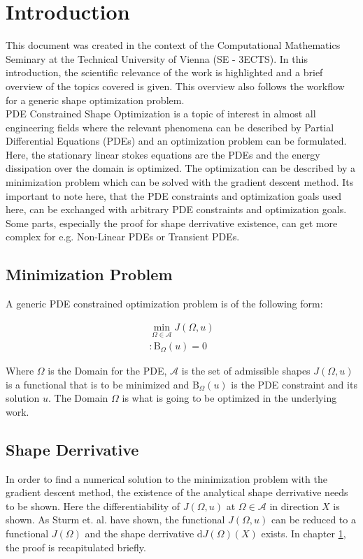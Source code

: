 \section{Introduction}

This document was created in the context of the Computational Mathematics Seminary
at the Technical University of Vienna (SE - 3ECTS). In this introduction, the scientific relevance
of the work is highlighted and a brief overview of the topics covered is given. This overview
also follows the workflow for a generic shape optimization problem.\\

PDE Constrained Shape Optimization is a topic of interest in almost all engineering fields
where the relevant phenomena can be described by Partial Differential Equations (PDEs) and
an optimization problem can be formulated. Here, the stationary linear stokes equations are
the PDEs and the energy dissipation over the domain is optimized. The optimization can 
be described by a minimization problem which can be solved with the gradient descent method.
Its important to note here, that the PDE constraints and optimization goals used here, 
can be exchanged with arbitrary PDE constraints and optimization goals. Some parts,
especially the proof for shape derrivative existence, can get more complex for e.g. 
Non-Linear PDEs or Transient PDEs.\\

\subsection*{Minimization Problem}
A generic PDE constrained optimization problem is of the following form:

\begin{align*}
        \min_{ \Omega \in \mathcal{A} } J( \Omega, u) \\
        : \mathrm{B}_{\Omega}(u) = 0
\end{align*}

Where $\Omega$ is the Domain for the PDE, $\mathcal{A}$ is the set of admissible shapes
$J(\Omega, u)$ is a functional that is to be minimized and $\mathrm{B}_{\Omega}(u)$ is the PDE
constraint and its solution $u$. The Domain $\Omega$ is what is going to be 
optimized in the underlying work. \\

\subsection*{Shape Derrivative}
In order to find a numerical solution to the minimization problem with the gradient descent
method, the existence of the analytical shape derrivative needs to be shown. Here the
differentiability of $J(\Omega,u)$ at $\Omega \in \mathcal{A}$ in direction $X$ is shown. 
As Sturm et. al. \cite{nearly_conformal_paper} have shown, the functional 
$J(\Omega, u)$ can be reduced to a functional $J(\Omega)$ and the shape derrivative 
$\mathrm{d}J(\Omega)(X)$ exists. In chapter \ref*{}, the proof is recapitulated briefly.

